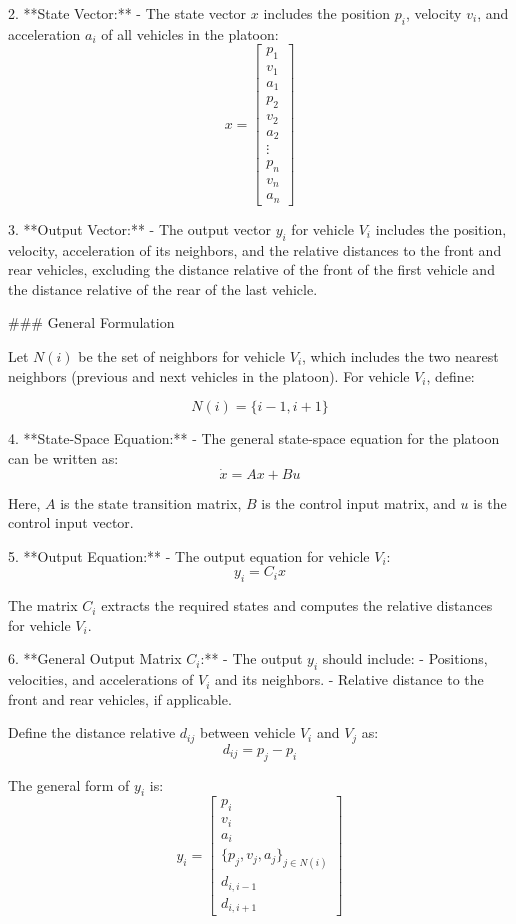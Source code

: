 \documentclass[letterpaper, 10pt, conference]{ieeeconf}  %
\begin{document}
2. **State Vector:**
   - The state vector \( x \) includes the position \( p_i \), velocity \( v_i \), and acceleration \( a_i \) of all vehicles in the platoon:
     \[
     x = \begin{bmatrix}
     p_1 \\ v_1 \\ a_1 \\ p_2 \\ v_2 \\ a_2 \\ \vdots \\ p_n \\ v_n \\ a_n
     \end{bmatrix}
     \]

3. **Output Vector:**
   - The output vector \( y_i \) for vehicle \( V_i \) includes the position, velocity, acceleration of its neighbors, and the relative distances to the front and rear vehicles, excluding the distance relative of the front of the first vehicle and the distance relative of the rear of the last vehicle.

### General Formulation

Let \( N(i) \) be the set of neighbors for vehicle \( V_i \), which includes the two nearest neighbors (previous and next vehicles in the platoon). For vehicle \( V_i \), define:

\[
N(i) = \{i-1, i+1\}
\]

4. **State-Space Equation:**
   - The general state-space equation for the platoon can be written as:
     \[
     \dot{x} = A x + B u
     \]

   Here, \( A \) is the state transition matrix, \( B \) is the control input matrix, and \( u \) is the control input vector.

5. **Output Equation:**
   - The output equation for vehicle \( V_i \):
     \[
     y_i = C_i x
     \]

   The matrix \( C_i \) extracts the required states and computes the relative distances for vehicle \( V_i \).

6. **General Output Matrix \( C_i \):**
   - The output \( y_i \) should include:
     - Positions, velocities, and accelerations of \( V_i \) and its neighbors.
     - Relative distance to the front and rear vehicles, if applicable.

   Define the distance relative \( d_{ij} \) between vehicle \( V_i \) and \( V_j \) as:
   \[
   d_{ij} = p_j - p_i
   \]

   The general form of \( y_i \) is:
   \[
   y_i = \begin{bmatrix}
   p_i \\ v_i \\ a_i \\ \{p_j, v_j, a_j\}_{j \in N(i)} \\ d_{i, i-1} \\ d_{i, i+1}
   \end{bmatrix}
   \]
\end{document}
